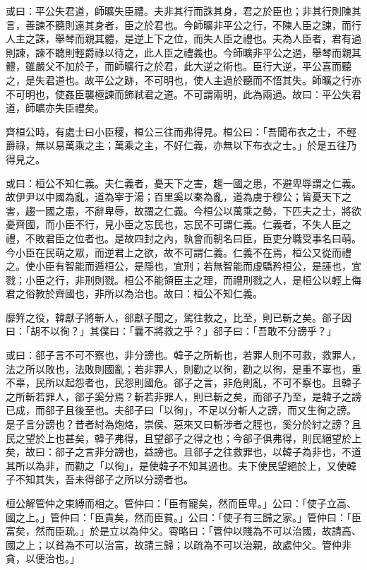 \begin{pinyinscope}
或曰：平公失君道，師曠失臣禮。夫非其行而誅其身，君之於臣也；非其行則陳其言，善諫不聽則遠其身者，臣之於君也。今師曠非平公之行，不陳人臣之諫，而行人主之誅，舉琴而親其體，是逆上下之位，而失人臣之禮也。夫為人臣者，君有過則諫，諫不聽則輕爵祿以待之，此人臣之禮義也。今師曠非平公之過，舉琴而親其體，雖嚴父不加於子，而師曠行之於君，此大逆之術也。臣行大逆，平公喜而聽之，是失君道也。故平公之跡，不可明也，使人主過於聽而不悟其失。師曠之行亦不可明也，使姦臣襲極諫而飾弒君之道。不可謂兩明，此為兩過。故曰：平公失君道，師曠亦失臣禮矣。

齊桓公時，有處士曰小臣稷，桓公三往而弗得見。桓公曰：「吾聞布衣之士，不輕爵祿，無以易萬乘之主；萬乘之主，不好仁義，亦無以下布衣之士。」於是五往乃得見之。

或曰：桓公不知仁義。夫仁義者，憂天下之害，趨一國之患，不避卑辱謂之仁義。故伊尹以中國為亂，道為宰于湯；百里奚以秦為亂，道為虜于穆公；皆憂天下之害，趨一國之患，不辭卑辱，故謂之仁義。今桓公以萬乘之勢，下匹夫之士，將欲憂齊國，而小臣不行，見小臣之忘民也，忘民不可謂仁義。仁義者，不失人臣之禮，不敗君臣之位者也。是故四封之內，執會而朝名曰臣，臣吏分職受事名曰萌。今小臣在民萌之眾，而逆君上之欲，故不可謂仁義。仁義不在焉，桓公又從而禮之。使小臣有智能而遁桓公，是隱也，宜刑；若無智能而虛驕矜桓公，是誣也，宜戮；小臣之行，非刑則戮。桓公不能領臣主之理，而禮刑戮之人，是桓公以輕上侮君之俗教於齊國也，非所以為治也。故曰：桓公不知仁義。

靡笄之役，韓獻子將斬人，郤獻子聞之，駕往救之，比至，則已斬之矣。郤子因曰：「胡不以徇？」其僕曰：「曩不將救之乎？」郤子曰：「吾敢不分謗乎？」

或曰：郤子言不可不察也，非分謗也。韓子之所斬也，若罪人則不可救，救罪人，法之所以敗也，法敗則國亂；若非罪人，則勸之以徇，勸之以徇，是重不辜也，重不辜，民所以起怨者也，民怨則國危。郤子之言，非危則亂，不可不察也。且韓子之所斬若罪人，郤子奚分焉？斬若非罪人，則已斬之矣，而郤子乃至，是韓子之謗已成，而郤子且後至也。夫郤子曰「以徇」，不足以分斬人之謗，而又生徇之謗。是子言分謗也？昔者紂為炮烙，崇侯、惡來又曰斬涉者之脛也，奚分於紂之謗？且民之望於上也甚矣，韓子弗得，且望郤子之得之也；今郤子俱弗得，則民絕望於上矣，故曰：郤子之言非分謗也，益謗也。且郤子之往救罪也，以韓子為非也，不道其所以為非，而勸之「以徇」，是使韓子不知其過也。夫下使民望絕於上，又使韓子不知其失，吾未得郤子之所以分謗者也。

桓公解管仲之束縛而相之。管仲曰：「臣有寵矣，然而臣卑。」公曰：「使子立高、國之上。」管仲曰：「臣貴矣，然而臣貧。」公曰：「使子有三歸之家。」管仲曰：「臣富矣，然而臣疏。」於是立以為仲父。霄略曰：「管仲以賤為不可以治國，故請高、國之上；以貧為不可以治富，故請三歸；以疏為不可以治親，故處仲父。管仲非貪，以便治也。」


\end{pinyinscope}
